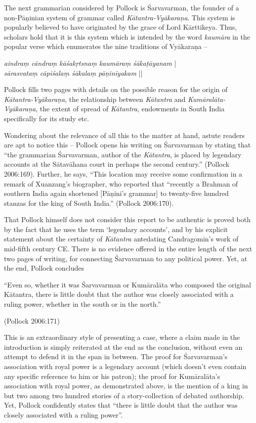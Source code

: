 The next grammarian considered by Pollock is Śarvavarman, the founder of a non-Pāṇinian system of grammar called {\sl Kātantra-Vyākaraṇa}. This system is popularly believed to have originated by the grace of Lord Kārttikeya. Thus, scholars hold that it is this system which is intended by the word {\sl kaumāra} in the popular verse which enumerates the nine traditions of Vyākaraṇa --
\begin{myquote}
{{\sl aindraṃ cāndraṃ kāśakṛtsnaṃ kaumāraṃ śākaṭāyanam}} |\\ 
{{\sl sārasvataṃ cāpiśalaṃ śākalaṃ pāṇinīyakam}} || 
\end{myquote}
Pollock fills two pages with details on the possible reason for the origin of {\sl Kātantra-Vyākaraṇa}, the relationship between {\sl Kātantra} and {\sl Kumāralāta-Vyākaraṇa}, the extent of spread of {\sl Kātantra}, endowments in South India specifically for its study etc. 

Wondering about the relevance of all this to the matter at hand, astute readers are apt to notice this -- Pollock opens his writing on Śarvavarman by stating that ``the grammarian Śarvavarman, author of the {\sl Kātantra}, is placed by legendary accounts at the Sātavāhana court in perhaps the second century.'' (Pollock 2006:169). Further, he says, ``This location may receive some confirmation in a remark of Xuanzang's biographer, who reported that ``recently a Brahman of southern India again shortened [Pāṇini’s grammar] to twenty-five hundred stanzas for the king of South India.'' (Pollock 2006:170). 

That Pollock himself does not consider this report to be authentic is proved both by the fact that he uses the term `legendary accounts', and by his explicit statement about the certainty of {\sl Kātantra} antedating Candragomin's work of mid-fifth century CE. There is no evidence offered in the entire length of the next two pages of writing, for connecting Śarvavarman to any political power. Yet, at the end, Pollock concludes 
\begin{myquote}
``Even so, whether it was Śarvavarman or Kumāralāta who composed the original Kātantra, there is little doubt that the author was closely associated with a ruling power, whether in the south or in the north.''

\hfill (Pollock 2006:171) 
\end{myquote}
This is an extraordinary style  of presenting a case, where a claim made in the introduction is simply reiterated at the end as the conclusion, without even an attempt to defend it in the span in between. The proof for Śarvavarman’s association with royal power is a legendary account (which doesn't even contain any specific reference to him or his patron); the proof for Kumāralāta's association with royal power, as demonstrated above, is the mention of a king in but two among two hundred stories of a story-collection of debated authorship. Yet, Pollock confidently states that ``there is little doubt that the author was closely associated with a ruling power''. 

